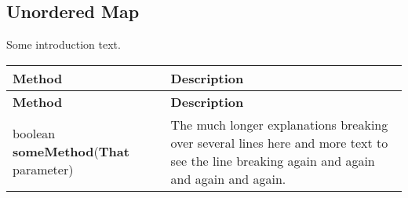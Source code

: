 \documentclass[main]{subfiles}
\begin{document}

\subsection{Unordered Map}
\renewcommand{\arraystretch}{1.5}


Some introduction text.

\scriptsize
\begin{longtable}{p{0.4\linewidth} p{0.6\linewidth}}
\hline \textbf{Method} & \textbf{Description}\\ \hline
\endfirsthead

\hline \textbf{Method} & \textbf{Description}\\ \hline\hline
\endhead
boolean \textbf{someMethod}(\textbf{That} parameter) & The much longer explanations breaking over several lines here and more text to see the line breaking again and again and again and again.\\
\end{longtable}
\todo[inline]{}
\end{document}
